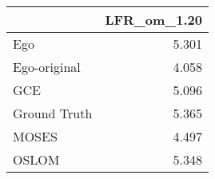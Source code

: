 \begin{tabular}{lr}
\toprule
{} & LFR_om_1.20 \\
\midrule
Ego          &       5.301 \\
Ego-original &       4.058 \\
GCE          &       5.096 \\
Ground Truth &       5.365 \\
MOSES        &       4.497 \\
OSLOM        &       5.348 \\
\bottomrule
\end{tabular}
